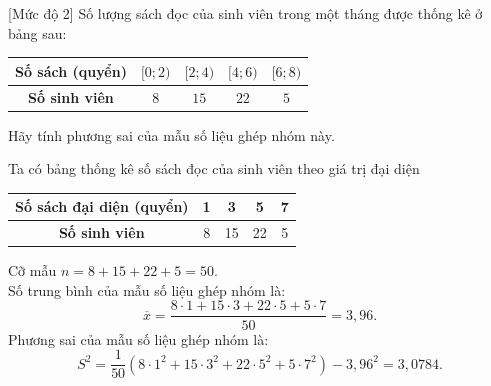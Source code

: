 \begin{bt}%
[Mức độ 2]%
Số lượng sách đọc của sinh viên trong một tháng được thống kê ở bảng sau:
\begin{center}
\begin{tabular}{|c|c|c|c|c|}
\hline
\textbf{Số sách (quyển)} & $[0; 2)$ & $[2; 4)$ & $[4; 6)$ & $[6; 8)$ \\
\hline
\textbf{Số sinh viên} & $8$ & $15$ & $22$ & $5$ \\
\hline
\end{tabular}
\end{center}
Hãy tính phương sai của mẫu số liệu ghép nhóm này.
\loigiai
{
Ta có bảng thống kê số sách đọc của sinh viên theo giá trị đại diện
\begin{center}
\begin{tabular}{|c|c|c|c|c|}
\hline
\textbf{Số sách đại diện (quyển)} & 1 & 3 & 5 & 7 \\
\hline
\textbf{Số sinh viên} & 8 & 15 & 22 & 5 \\
\hline
\end{tabular}
\end{center}
Cỡ mẫu $n=8+15+22+5=50$.\\
Số trung bình của mẫu số liệu ghép nhóm là:
\[ \overline{x}=\dfrac{8\cdot 1+15\cdot 3+22\cdot 5+5\cdot 7}{50}=3{,}96. \]
Phương sai của mẫu số liệu ghép nhóm là:
\[ S^2=\dfrac{1}{50}\left(8\cdot 1^2+15\cdot 3^2+22\cdot 5^2+5\cdot 7^2 \right)-3{,}96^2= 3{,}0784. \]
}
\end{bt}

